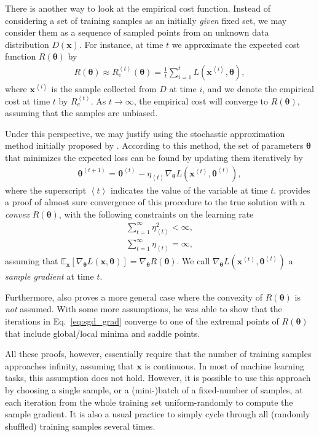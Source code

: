 \documentclass{now}
\newcommand{\qexp}[1]{\left<#1\right>}
\newcommand{\vect}[1]{\mathbf{#1}}
\newcommand{\vects}[1]{\boldsymbol{#1}}
\newcommand{\vx}[0]{\vect{x}}
\newcommand{\TT}[0]{{\vects{\theta}}}
\newcommand{\E}[0]{\mathbb{E}}
\begin{document}
There is another way to look at the empirical cost
function. Instead of considering a set of training samples
as an initially \textit{given} fixed set, we may consider
them as a sequence of sampled points from an unknown
data distribution $D(\vx)$. For instance, at time $t$ we
approximate the expected cost function $R(\TT)$ by
\begin{align*}
    R(\TT) \approx R_e^{\qexp{t}}(\TT) = \frac{1}{t}
    \sum_{i=1}^t L(\vx^{\qexp{i}}, \TT),
\end{align*}
where $\vx^{\qexp{i}}$ is the sample collected from $D$ at time
$i$, and we denote the empirical cost at time $t$ by
$R_e^{\qexp{t}}$. As $t\to\infty$, the empirical cost will
converge to $R(\TT)$, assuming that the samples are unbiased.

Under this perspective, we may justify using the stochastic
approximation method initially proposed by
\citet{Robbins1951}.  According to this method, the set of
parameters $\TT$ that minimizes the expected loss can be
found by updating them iteratively by
\begin{align}
    \label{eq:sgd_grad}
    \TT^{\qexp{t+1}} = \TT^{\qexp{t}} - \eta_{\qexp{t}}
    \nabla_{\TT} L(\vx^{\qexp{t}},
    \TT^{\qexp{t}}),
\end{align}
where the superscript $\qexp{t}$ indicates the value of the
variable at time $t$. \citet{Bottou1998} provides a proof of
almost sure convergence of this procedure to the true
solution with a \textit{convex} $R(\TT)$, with the following
constraints on the learning rate
\begin{align}
    \label{eq:sgd_lr_cond1}
    \sum_{t=1}^\infty \eta_{\qexp{t}}^2 < \infty, \\
    \label{eq:sgd_lr_cond2}
    \sum_{t=1}^\infty \eta_{\qexp{t}} = \infty,
\end{align}
assuming that $\E_\vx \left[ \nabla_{\TT} L(\vx, \TT) \right] =
\nabla_\TT R(\TT)$. We call $\nabla_{\TT} L(\vx^{\qexp{t}},
\TT^{\qexp{t}})$ a \textit{sample gradient} at time $t$.

Furthermore, \citet{Bottou1998} also proves a more general
case where the convexity of $R(\TT)$ is \textit{not}
assumed. With some more assumptions, he was able to show
that the iterations in Eq.~\eqref{eq:sgd_grad} converge to
one of the extremal points of $R(\TT)$ that include
global/local minima and saddle points.

All these proofs, however, essentially require that the
number of training samples approaches infinity, assuming
that $\vx$ is continuous. In most of machine learning tasks,
this assumption does not hold. However, it is possible to
use this approach by choosing a single sample, or a (mini-)batch of
a fixed-number of samples, at each iteration from the whole
training set uniform-randomly to compute the sample
gradient. It is also a usual practice to simply cycle
through all (randomly shuffled) training samples several
times.
\end{document}
